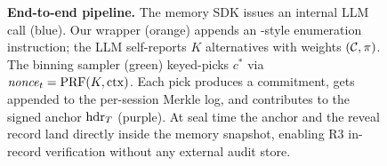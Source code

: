 \begin{figure}[t]
\begin{tikzpicture}
\end{tikzpicture}
\caption{\textbf{End-to-end \memmark{} pipeline.} The memory SDK
issues an internal LLM call (blue). Our wrapper (orange) appends an
\agentmark-style enumeration instruction; the LLM self-reports
$K$ alternatives with weights $(\mathcal{C}, \pi)$. The binning
sampler (green) keyed-picks $c^*$ via $\mathit{nonce}_t = \text{PRF}(K,
\mathrm{ctx})$. Each pick produces a commitment, gets appended to the
per-session Merkle log, and contributes to the signed anchor
$\mathrm{hdr}_T$ (purple). At seal time the anchor and the reveal record
land directly inside the memory snapshot, enabling R3 in-record
verification without any external audit store.}
\label{fig:pipeline}
\end{figure}
